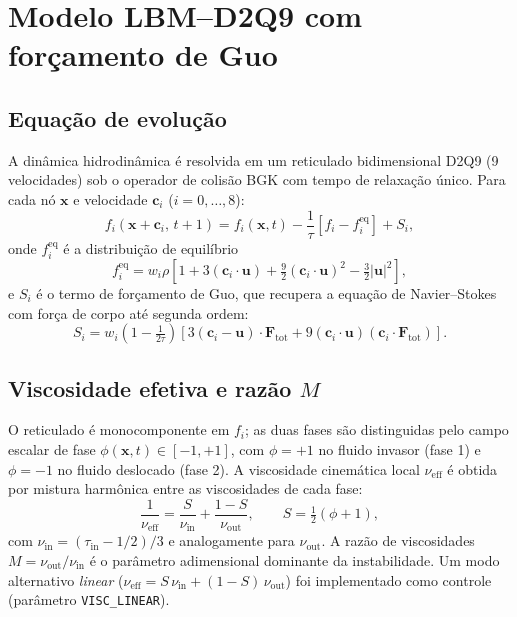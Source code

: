 \documentclass[11pt,a4paper]{article}
\begin{document}
\section{Modelo LBM--D2Q9 com forçamento de Guo}

\subsection{Equação de evolução}

A dinâmica hidrodinâmica é resolvida em um reticulado bidimensional D2Q9
(9 velocidades) sob o operador de colisão BGK com tempo de relaxação único.
Para cada nó $\mathbf{x}$ e velocidade $\mathbf{c}_i$ ($i=0,\ldots,8$):
\begin{equation}
    f_i(\mathbf{x}+\mathbf{c}_i,\,t+1) = f_i(\mathbf{x},t)
    - \frac{1}{\tau}\!\left[f_i - f_i^{\mathrm{eq}}\right]
    + S_i,
    \label{eq:lbm}
\end{equation}
onde $f_i^{\mathrm{eq}}$ é a distribuição de equilíbrio
\begin{equation}
    f_i^{\mathrm{eq}} = w_i \rho \left[ 1 + 3(\mathbf{c}_i\!\cdot\!\mathbf{u})
    + \tfrac{9}{2}(\mathbf{c}_i\!\cdot\!\mathbf{u})^2
    - \tfrac{3}{2}|\mathbf{u}|^2 \right],
\end{equation}
e $S_i$ é o termo de forçamento de Guo, que recupera a equação de
Navier--Stokes com força de corpo até segunda ordem:
\begin{equation}
    S_i = w_i\!\left(1 - \tfrac{1}{2\tau}\right)
    \!\left[ 3(\mathbf{c}_i - \mathbf{u})\!\cdot\!\mathbf{F}_{\mathrm{tot}}
    + 9(\mathbf{c}_i\!\cdot\!\mathbf{u})(\mathbf{c}_i\!\cdot\!\mathbf{F}_{\mathrm{tot}}) \right].
    \label{eq:guo}
\end{equation}

\subsection{Viscosidade efetiva e razão $M$}

O reticulado é monocomponente em $f_i$; as duas fases são distinguidas pelo
campo escalar de fase $\phi(\mathbf{x},t)\in[-1,+1]$, com $\phi=+1$ no
fluido invasor (fase 1) e $\phi=-1$ no fluido deslocado (fase 2). A
viscosidade cinemática local $\nu_{\mathrm{eff}}$ é obtida por mistura
harmônica entre as viscosidades de cada fase:
\begin{equation}
    \frac{1}{\nu_{\mathrm{eff}}} = \frac{S}{\nu_{\mathrm{in}}} + \frac{1-S}{\nu_{\mathrm{out}}},
    \qquad S = \tfrac{1}{2}(\phi+1),
    \label{eq:nu_harm}
\end{equation}
com $\nu_{\mathrm{in}} = (\tau_{\mathrm{in}}-1/2)/3$ e analogamente para
$\nu_{\mathrm{out}}$. A razão de viscosidades $M=\nu_{\mathrm{out}}/\nu_{\mathrm{in}}$
é o parâmetro adimensional dominante da instabilidade. Um modo alternativo
\textit{linear} ($\nu_{\mathrm{eff}} = S\,\nu_{\mathrm{in}} + (1-S)\,\nu_{\mathrm{out}}$)
foi implementado como controle (parâmetro \texttt{VISC\_LINEAR}).
\end{document}
